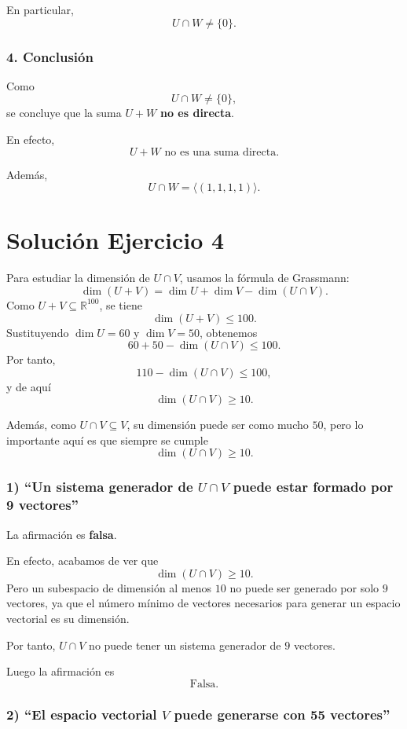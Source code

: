 \documentclass[12pt]{article}
\begin{document}
En particular,
\[
U\cap W\neq \{0\}.
\]

\subsubsection*{4. Conclusión}

Como
\[
U\cap W\neq\{0\},
\]
se concluye que la suma \(U+W\) \textbf{no es directa}.

En efecto,
\[
\boxed{U+W \text{ no es una suma directa}.}
\]

Además,
\[
\boxed{U\cap W=\langle(1,1,1,1)\rangle.}
\]

\section*{Solución Ejercicio 4}

Para estudiar la dimensión de \(U\cap V\), usamos la fórmula de Grassmann:
\[
\dim(U+V)=\dim U+\dim V-\dim(U\cap V).
\]
Como \(U+V\subseteq \mathbb{R}^{100}\), se tiene
\[
\dim(U+V)\leq 100.
\]
Sustituyendo \(\dim U=60\) y \(\dim V=50\), obtenemos
\[
60+50-\dim(U\cap V)\leq 100.
\]
Por tanto,
\[
110-\dim(U\cap V)\leq 100,
\]
y de aquí
\[
\dim(U\cap V)\geq 10.
\]

Además, como \(U\cap V\subseteq V\), su dimensión puede ser como mucho \(50\), pero lo importante aquí es que siempre se cumple
\[
\dim(U\cap V)\geq 10.
\]

\subsubsection*{1) ``Un sistema generador de \(U\cap V\) puede estar formado por 9 vectores''}

La afirmación es \textbf{falsa}.

En efecto, acabamos de ver que
\[
\dim(U\cap V)\geq 10.
\]
Pero un subespacio de dimensión al menos \(10\) no puede ser generado por solo \(9\) vectores, ya que el número mínimo de vectores necesarios para generar un espacio vectorial es su dimensión.

Por tanto, \(U\cap V\) no puede tener un sistema generador de \(9\) vectores.

Luego la afirmación es
\[
\boxed{\text{Falsa}.}
\]

\subsubsection*{2) ``El espacio vectorial \(V\) puede generarse con 55 vectores''}
\end{document}
